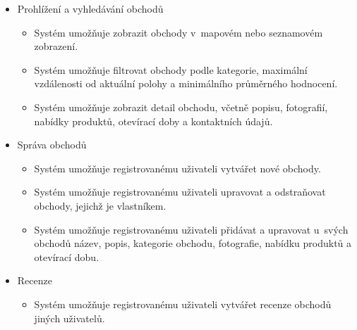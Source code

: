 \begin{itemize}
    \item Prohlížení a vyhledávání obchodů
    \begin{itemize}
        \item Systém umožňuje zobrazit obchody v~mapovém nebo seznamovém zobrazení.
        \item Systém umožňuje filtrovat obchody podle kategorie, maximální vzdálenosti od aktuální polohy a minimálního průměrného hodnocení.
        \item Systém umožňuje zobrazit detail obchodu, včetně popisu, fotografií, nabídky produktů, otevírací doby a kontaktních údajů.
    \end{itemize}


    \item Správa obchodů
    \begin{itemize}
        \item Systém umožňuje registrovanému uživateli vytvářet nové obchody.
        \item Systém umožňuje registrovanému uživateli upravovat a odstraňovat obchody, jejichž je vlastníkem.
        \item Systém umožňuje registrovanému uživateli přidávat a upravovat u~svých obchodů název, popis, kategorie obchodu, fotografie, nabídku produktů a otevírací dobu.
    \end{itemize}

    \item Recenze
    \begin{itemize}
        \item Systém umožňuje registrovanému uživateli vytvářet recenze obchodů jiných uživatelů.
    \end{itemize}
\end{itemize}

